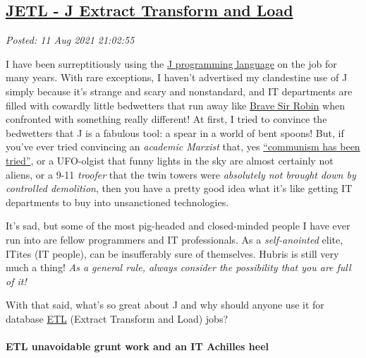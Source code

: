 %

\subsection*{\href{http://analyzethedatanotthedrivel.org/2021/08/11/jetl-j-extract-transform-and-load/}{JETL - J Extract Transform and Load}}


\noindent\emph{Posted: 11 Aug 2021 21:02:55}
\vspace{6pt}

    I have been surreptitiously using the
\href{https://code.jsoftware.com/wiki/NuVoc}{J programming language} on
the job for many years. With rare exceptions, I haven't advertised my
clandestine use of J simply because it's strange and scary and
nonstandard, and IT departments are filled with cowardly little
bedwetters that run away like
\href{https://www.youtube.com/watch?v=BZwuTo7zKM8}{Brave Sir Robin} when
confronted with something really different! At first, I tried to
convince the bedwetters that J is a fabulous tool: a spear in a world of
bent spoons! But, if you've ever tried convincing an \emph{academic
Marxist} that, yes
\href{https://www.quora.com/Why-do-communists-insist-that-real-communism-has-never-been-tried?share=1}{``communism
has been tried''}, or a UFO-olgist that funny lights in the sky are
almost certainly not aliens, or a 9-11 \emph{troofer} that the twin
towers were \emph{absolutely not brought down by controlled demolition},
then you have a pretty good idea what it's like getting IT departments
to buy into unsanctioned technologies.

It's sad, but some of the most pig-headed and closed-minded people I
have ever run into are fellow programmers and IT professionals. As a
\emph{self-anointed} elite, ITites (IT people), can be insufferably sure
of themselves. Hubris is still very much a thing! \emph{As a general
rule, always consider the possibility that you are full of it!}

With that said, what's so great about J and why should anyone use it for
database \href{https://www.ibm.com/cloud/learn/etl}{ETL} (Extract
Transform and Load) jobs?

    \hypertarget{etl-unavoidable-grunt-work-and-an-it-achilles-heel}{%
\paragraph{ETL unavoidable grunt work and an IT Achilles
heel}\label{etl-unavoidable-grunt-work-and-an-it-achilles-heel}}

